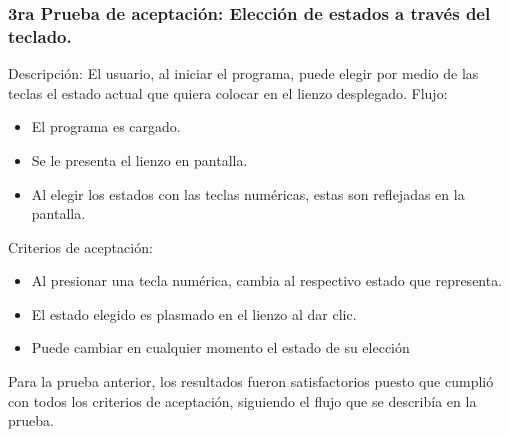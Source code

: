    \subsubsection{3ra Prueba de aceptaci\'on: Elecci\'on de estados a trav\'es del teclado.}
        Descripci\'on: El usuario, al iniciar el programa, puede elegir por medio de las teclas el estado actual que quiera colocar en
            el lienzo desplegado.
        Flujo:
        \begin{itemize}
            \item El programa es cargado.
            \item Se le presenta el lienzo en pantalla.
            \item Al elegir los estados con las teclas num\'ericas, estas son
            reflejadas en la pantalla.
        \end{itemize}
        \vskip 0.5cm
        Criterios de aceptaci\'on:
        \begin{itemize}
            \item Al presionar una tecla num\'erica, cambia al respectivo
            estado que representa.
            \item El estado elegido es plasmado en el lienzo al dar clic.
            \item Puede cambiar en cualquier momento el estado de su
            elecci\'on
        \end{itemize}
        \vskip 0.5cm
        Para la prueba anterior, los resultados fueron satisfactorios
            puesto que cumpli\'o con todos los criterios de aceptaci\'on,
            siguiendo el flujo que se describ\'ia en la prueba.
    \vskip 0.5cm
